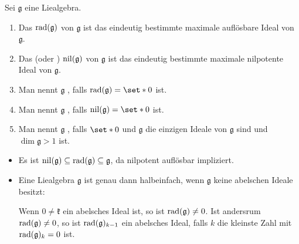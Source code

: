 \begin{definition}[{name=[Radikal und Nilradikal]},label=def:214]
	Sei $\mathfrak{g}$ eine Liealgebra.
	\begin{enumerate}[1),itemsep=0pt]
		\item Das  $\operatorname{rad} (\mathfrak{g})$ von $\mathfrak{g}$ ist das eindeutig bestimmte maximale auflösbare Ideal von $\mathfrak{g}$.
		\item Das  (oder )  $\operatorname{nil} (\mathfrak{g})$ von $\mathfrak{g}$ ist das eindeutig bestimmte maximale nilpotente Ideal von $\mathfrak{g}$.
		\item Man nennt $\mathfrak{g}$ , falls $\rad(\mathfrak{g}) = \set*{0}$ ist.
		\item Man nennt $\mathfrak{g}$ , falls $\nil(\mathfrak{g})= \set*{0}$ ist.
		\item Man nennt $\mathfrak{g}$ , falls $\set*{0}$ und $\mathfrak{g}$ die einzigen Ideale von $\mathfrak{g}$ sind und $\dim \mathfrak{g} > 1$ ist.
	\end{enumerate}
\end{definition}

\begin{bemerkung*}[{name=[Charakterisierung von halbeinfach]}]
	\begin{itemize}
		\item Es ist $\operatorname{nil}(\mathfrak{g}) \subseteq \operatorname{rad}(\mathfrak{g}) \subseteq \mathfrak{g}$, da nilpotent auflösbar impliziert.
		\item Eine Liealgebra $\mathfrak{g}$ ist genau dann halbeinfach, wenn $\mathfrak{g}$ keine abelschen Ideale besitzt:
		
		Wenn $0\neq\mathfrak{k}$ ein abelsches Ideal ist, so ist $\operatorname{rad}(\mathfrak{g}) \neq 0$.
		Ist andersrum $\operatorname{rad}(\mathfrak{g})\neq 0$, so ist $\operatorname{rad}(\mathfrak{g})_{k-1}$ ein abelsches Ideal, falls $k$ die kleinste Zahl mit $\operatorname{rad}(\mathfrak{g})_k=0$ ist.
	\end{itemize}
\end{bemerkung*}

